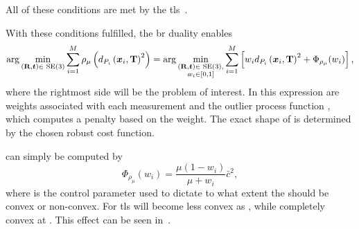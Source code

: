 All of these conditions are met by the \gls{tls}~\cite{graduated-non-convexity-for-robust-spatial-perception:-from-non-minimal-solvers-to-global-outlier-rejection}.\medskip

With these conditions fulfilled, the \gls{br} duality enables
%
\begin{equation}\label{eq:br-result}
	\arg \min_{(\bm{\mathrm{R}},\bm{t})\in\text{ SE} (3)} \sum^M_{i=1} \rho_\mu \left(d_{P_i}\left( \bm{x}_i,\bm{\mathrm{T}} \right)^{2}\right) = 
	\arg \min_{\substack{(\bm{\mathrm{R}},\bm{t})\in\text{ SE} (3),\\ w_i\in [0,1]}} \sum^M_{i=1} \left[ w_i d_{P_i}\left( \bm{x}_i,\bm{\mathrm{T}} \right)^{2} + \Phi_{\rho_\mu}(w_i)\right],
\end{equation}
where the rightmost side will be the problem of interest. In this expression  are weights associated with each measurement  and the outlier process function , which computes a penalty based on the weight. The exact shape of  is determined by the chosen robust cost function. \medskip

 can simply be computed by
%
\begin{equation}
	\Phi_{\rho_\mu}(w_i) = \frac{\mu(1-w_i)}{\mu+w_i}\bar{c}^2,
\end{equation}
where \mvar{\mu} is the control parameter used to dictate to what extent the  should be convex or non-convex. For \gls{tls}  will become less convex as \mvar{\mu\rightarrow \infty}, while completely convex at . This effect can be seen in~.

